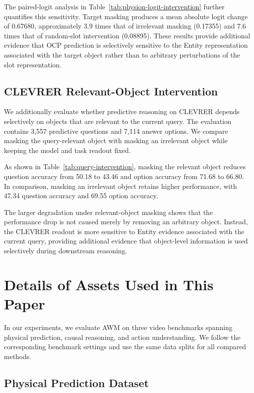 \documentclass{article}
\begin{document}
The paired-logit analysis in Table~\ref{tab:physion-logit-intervention} further quantifies this sensitivity. Target masking produces a mean absolute logit change of 0.67680, approximately 3.9 times that of irrelevant masking (0.17355) and 7.6 times that of random-slot intervention (0.08895). These results provide additional evidence that OCP prediction is selectively sensitive to the Entity representation associated with the target object rather than to arbitrary perturbations of the slot representation.

\subsection{CLEVRER Relevant-Object Intervention}
\label{app:query-object-intervention}

We additionally evaluate whether predictive reasoning on CLEVRER depends selectively on objects that are relevant to the current query. The evaluation contains 3,557 predictive questions and 7,114 answer options. We compare masking the query-relevant object with masking an irrelevant object while keeping the model and task readout fixed.



As shown in Table~\ref{tab:query-intervention}, masking the relevant object reduces question accuracy from 50.18 to 43.46 and option accuracy from 71.68 to 66.80. In comparison, masking an irrelevant object retains higher performance, with 47.34 question accuracy and 69.55 option accuracy.

The larger degradation under relevant-object masking shows that the performance drop is not caused merely by removing an arbitrary object. Instead, the CLEVRER readout is more sensitive to Entity evidence associated with the current query, providing additional evidence that object-level information is used selectively during downstream reasoning.

\section{Details of Assets Used in This Paper}
\label{app:dataset_detail}

In our experiments, we evaluate AWM on three video benchmarks spanning physical prediction, causal reasoning, and action understanding. We follow the corresponding benchmark settings and use the same data splits for all compared methods.

\subsection{Physical Prediction Dataset}
\end{document}
